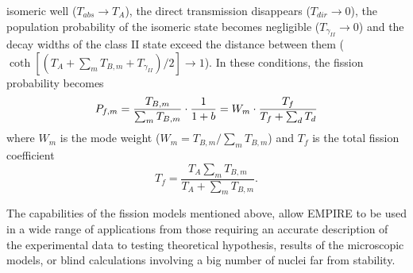 isomeric well ($T_{abs}\rightarrow T_{A}$), the direct transmission
disappears ($T_{dir}\rightarrow0$), the population probability of the
isomeric%
 state becomes negligible ($T_{\gamma_{II}}\rightarrow0$)
and the decay widths of the class II state exceed the distance between them (%
$%
\coth[(T_{A}+\sum_{m}T_{B,m}+T_{\gamma_{II}})/2]\rightarrow1$). In these
conditions, the fission probability becomes 
\begin{equation}
P_{f,m}=\frac{T_{B,m}}{\sum_{m}T_{B,m}}\cdot\frac{1}{1+b}=W_{m}\cdot\frac{%
T_{f}}{T_{f}+\sum_{d}T_{d}}  \label{wm}
\end{equation}
\noindent where $W_{m}$ is the mode weight ($W_{m}=T_{B,m}/\sum_{m}T_{B,m}$)
and $T_{f}$ is the total fission coefficient 
\begin{equation}
T_{f}=\frac{T_{A}\sum_{m}T_{B,m}}{T_{A}+\sum_{m}T_{B,m}}.
\end{equation}

The capabilities of the fission models mentioned above, allow EMPIRE to be
used in a wide range of applications from those requiring an accurate
description of the experimental data to testing theoretical hypothesis,
results of the microscopic models, or blind calculations involving a big
number of nuclei far from stability.


